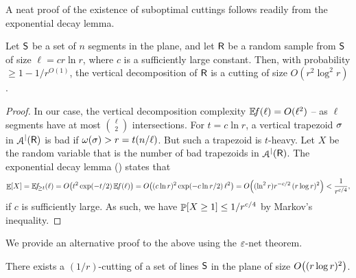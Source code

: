 A neat proof of the existence of suboptimal cuttings follows readily
from the exponential decay lemma.

\begin{lemma}
    Let $\mathsf{S}$ be a set of $n$ segments in the plane, and let
    $\mathsf{R}$ be a random sample from $\mathsf{S}$ of size
    $\ell = c r \ln r$, where $c$ is a sufficiently large
    constant. Then, with probability $\geq 1-1/r^{O(1)}$, the vertical
    decomposition of $\mathsf{R}$ is a cutting of size
    $O( r^2 \log^2 r)$.
\end{lemma}
\begin{proof}
    In our case, the vertical decomposition complexity
    $\NumOfRegionsZero{ \ell} = O(\ell^2)$ -- as $\ell$ segments have
    at most $\binom{\ell}{2}$ intersections.  For $t = c \ln r$, a
    vertical trapezoid $\sigma$ in $\ArrVD{\Sample}$ is bad if
    $\WeightX{\Trap} > r = t(n/\ell)$. But such a trapezoid is
    $t$-heavy.  Let $X$ be the random variable that is the number of
    bad trapezoids in $\ArrVD{\Sample}$. The exponential decay lemma
    () states that
    \begin{equation*}
        \Ex{X} =
        \NumOfRegions{t}{\ell}  %
        =%
        O\bigl( t^2
        \exp\pth{-t/2} \,  \NumOfRegionsZero{ \ell}
        \bigr)
        =
        O\bigl( (c \ln r)^2
        \exp\pth{-c\ln r/2} \,  \ell^2
        \bigr)
        =
        O\Bigl(  (\ln^2 r)
        r^{-c /2} \,  (r \log r)^2
        \Bigr)
        <%
        \frac{1}{r^{c/4}},
    \end{equation*}
    if $c$ is sufficiently large.  As such, we have
    $\Prob{X \geq 1} \leq {1}/{r^{c/4}}$ by Markov's inequality.
\end{proof}

We provide an alternative proof to the above using the ${\varepsilon}$-net
theorem.
\begin{lemma}
    There exists a $(1/r)$-cutting of a set of lines $\mathsf{S}$ in the
    plane of size $O\pth{ (r\log r)^2 }$.
\end{lemma}

